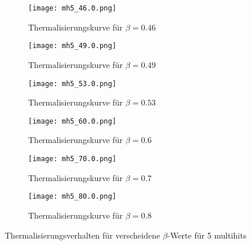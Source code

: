 \documentclass[12pt]{article}
\begin{document}
\vspace*{-4cm}\begin{figure}[H]\hspace*{-1.5cm}
            \begin{subfigure}{0.4\textwidth}
            \texttt{[image: mh5\_46.0.png]}
            \caption{Thermalisierungskurve für $\beta=0.46$}
            \end{subfigure}
            \hfill
            \begin{subfigure}{0.4\textwidth}
            \hspace*{-0.8cm}
            \texttt{[image: mh5\_49.0.png]}
            \caption{Thermalisierungskurve für $\beta=0.49$}
            \end{subfigure}
            \hfill
            \hspace*{-1.5cm}
            \begin{subfigure}{0.4\textwidth}
            \texttt{[image: mh5\_53.0.png]}
            \caption{Thermalisierungskurve für $\beta=0.53$}
            \end{subfigure}
            \hfill
            \begin{subfigure}{0.4\textwidth}
            \hspace*{-0.8cm}
            \texttt{[image: mh5\_60.0.png]}
            \caption{Thermalisierungskurve für $\beta=0.6$}
            \end{subfigure}
            \hfill
            \hspace*{-1.5cm}
            \begin{subfigure}{0.4\textwidth}
            \texttt{[image: mh5\_70.0.png]}
            \caption{Thermalisierungskurve für $\beta=0.7$}
            \end{subfigure}
            \hfill
            \begin{subfigure}{0.4\textwidth}
            \hspace*{-0.8cm}
            \texttt{[image: mh5\_80.0.png]}
            \caption{Thermalisierungskurve für $\beta=0.8$}
            \end{subfigure}
            \hfill
            \caption{Thermalisierungsverhalten für verscheidene $\beta$-Werte für 5 multihits}
\end{figure}


       
    
\end{document}
